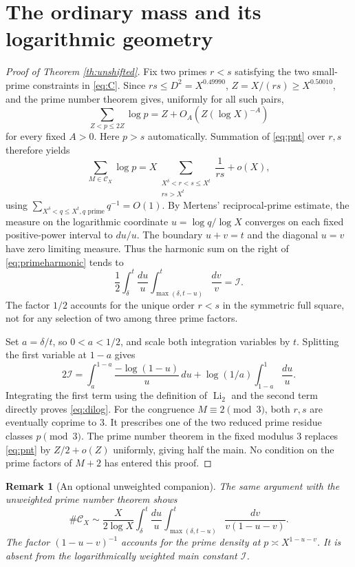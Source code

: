 \documentclass[11pt]{article}
\newtheorem{remark}[theorem]{Remark}
\newcommand{\cset}{\mathcal C}
\begin{document}
\section{The ordinary mass and its logarithmic geometry}

\begin{proof}[Proof of Theorem \ref{th:unshifted}]
Fix two primes $r<s$ satisfying the two small-prime constraints
in \eqref{eq:C}.  Since $rs\le D^2=X^{0.49990}$,
$Z=X/(rs)\ge X^{0.50010}$, and the prime number theorem gives,
uniformly for all such pairs,
\begin{equation}\label{eq:pnt}
 \sum_{Z<p\le2Z}\log p=Z+O_A(Z(\log X)^{-A})
\end{equation}
for every fixed $A>0$.  Here $p>s$ automatically.  Summation
of \eqref{eq:pnt} over $r,s$ therefore yields
\begin{equation}\label{eq:primeharmonic}
 \sum_{M\in\cset_X}\log p
  =X\sum_{\substack{X^\delta<r<s\le X^t\\rs>X^t}}
       \frac1{rs}+o(X),
\end{equation}
using $\sum_{X^\delta<q\le X^t,q\text{ prime}}q^{-1}=O(1)$.
By Mertens' reciprocal-prime estimate, the measure on the logarithmic
coordinate $u=\log q/\log X$ converges on each fixed positive-power
interval to $du/u$.  The boundary $u+v=t$ and the diagonal $u=v$
have zero limiting measure.  Thus the harmonic sum on the right
of \eqref{eq:primeharmonic} tends to
\[
 \frac12\int_\delta^t\frac{du}{u}
       \int_{\max(\delta,t-u)}^t\frac{dv}{v}=\mathcal I.
\]
The factor $1/2$ accounts for the unique order $r<s$ in the symmetric
full square, not for any selection of two among three prime factors.

Set $a=\delta/t$, so $0<a<1/2$, and scale both integration variables
by $t$.  Splitting the first variable at $1-a$ gives
\[
 2\mathcal I=
 \int_a^{1-a}\frac{-\log(1-u)}u\,du
 +\log(1/a)\int_{1-a}^1\frac{du}{u}.
\]
Integrating the first term using the definition of $\operatorname{Li}_2$
and the second term directly proves \eqref{eq:dilog}.
For the congruence $M\equiv2\pmod3$, both $r,s$ are eventually
coprime to $3$.  It prescribes one of the two reduced prime residue
classes $p\pmod3$.  The prime number theorem in the fixed modulus $3$
replaces \eqref{eq:pnt} by $Z/2+o(Z)$ uniformly, giving half the main.
No condition on the prime factors of $M+2$ has entered this proof.
\end{proof}

\begin{remark}[An optional unweighted companion]
The same argument with the unweighted prime number theorem shows
\[
 \#\cset_X\sim\frac{X}{2\log X}
 \int_\delta^t\frac{du}{u}
 \int_{\max(\delta,t-u)}^t\frac{dv}{v(1-u-v)}.
\]
The factor $(1-u-v)^{-1}$ accounts for the prime density at
$p\asymp X^{1-u-v}$.  It is absent from the \emph{logarithmically
weighted} main constant $\mathcal I$.
\end{remark}
\end{document}
